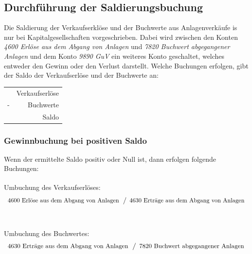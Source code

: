 \documentclass[a4paper,10pt]{report}
\begin{document}
\subsection{Durchführung der Saldierungsbuchung}
\label{sec:verkaufssaldierung}
Die Saldierung der Verkaufserklöse und der Buchwerte aus
Anlagenverkäufe is nur bei Kapitalgesellschaften vorgeschrieben. Dabei
wird zwischen den Konten \textit{4600 Erlöse aus dem Abgang von
Anlagen} und \textit{7820 Buchwert abgegangener Anlagen} und dem Konto
\textit{9890 GuV} ein weiteres Konto geschaltet, welches entweder den
Gewinn oder den Verlust darstellt. Welche Buchungen erfolgen, gibt der
Saldo der Verkaufserlöse und der Buchwerte an:
\begin{table}[h]
  \centering
  \begin{tabular}{l r}
    & Verkaufserlöse\\
    - & Buchwerte\\
    \hline
    & Saldo
  \end{tabular}
\end{table}

\subsubsection{Gewinnbuchung bei positiven Saldo}
Wenn der ermittelte Saldo positiv oder Null ist, dann erfolgen
folgende Buchungen:\\
\\
Umbuchung des Verkaufserlöses:
\begin{equation*}
  \begin{array}{l}
    \text{4600 Erlöse aus dem Abgang von Anlagen}\\
  \end{array}
  \left\slash
    \begin{array}{l}
      \text{4630 Erträge aus dem Abgang von Anlagen}\\
    \end{array}
  \right.
\end{equation*}\\
\\
Umbuchung des Buchwertes:
\begin{equation*}
  \begin{array}{l}
    \text{4630 Erträge aus dem Abgang von Anlagen}\\
  \end{array}
  \left\slash
    \begin{array}{l}
      \text{7820 Buchwert abgegangener Anlagen}\\
    \end{array}
  \right.
\end{equation*}
\end{document}
